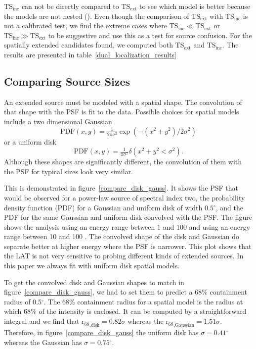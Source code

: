 \documentclass[12pt,preprint]{aastex}
\newcommand{\gev}{\text{GeV}\xspace}
\newcommand{\tsext}{{\ensuremath{\text{TS}_\text{ext}}}\xspace}
\newcommand{\tsinc}{\ensuremath{\text{TS}_\text{inc}}\xspace}
\newcommand{\rsixeight}{{\ensuremath{\text{r}_{68}}}\xspace}
\renewcommand{\deg}{\ensuremath{^\circ}\xspace}
\begin{document}
\tsinc can not be directly compared to \tsext to see which model is better
because the models are not nested (\cite{statistics_with_care}). Even
though the comparison of \tsext with \tsinc is not a calibrated test,
we find the extreme cases where $\tsinc \ll \tsext$ or $\tsinc\gg\tsext$
to be suggestive and use this as a test for source confusion. For the
spatially extended candidates found, we computed both \tsext and \tsinc.
The results are presented in table~\ref{dual_localization_results}

\subsection{Comparing Source Sizes}

\label{compare_source_size}

An extended source must be modeled with a spatial shape.
The convolution of that shape with the PSF is fit to the data.
Possible choices for spatial models include a two dimensional Gaussian
\begin{equation}
  \text{PDF}(x,y)=\tfrac{1}{2\pi\sigma^2}\exp\left(-(x^2+y^2)/2\sigma^2\right)
\end{equation}
or a uniform disk
\begin{equation}
  \text{PDF}(x,y)=\tfrac{1}{\pi\sigma^2}\delta\left(x^2+y^2<\sigma^2\right).
\end{equation}
Although these shapes are significantly different, the
convolution of them with the PSF for typical sizes look very
similar.

This is demonstrated in figure~\ref{compare_disk_gauss}.  It shows the
PSF that would be observed for a power-law source of spectral index two,
the probability density function (PDF) for a Gaussian and uniform disk of width
$0.5\deg$, and the PDF for the same Gaussian
and uniform disk convolved with the PSF.  The figure shows the analysis
using an energy range between 1 \gev and 100 \gev and using an energy
range between 10 \gev and 100 \gev.  The convolved shape of the disk and
Gaussian do separate better at higher energy where the PSF is narrower.
This plot shows that the LAT is not very sensitive to probing different
kinds of extended sources.  In this paper we always fit with uniform disk
spatial models.

To get the convolved disk and Gaussian shapes to match in
figure~\ref{compare_disk_gauss}, we had to set them to predict
a 68\% containment radius of 0.5\deg.  The 68\% containment
radius for a spatial model is the radius at which 68\% of the
intensity is enclosed.  It can be computed by a straightforward
integral and we find that $\rsixeight_\text{,disk}=0.82\sigma$
whereas the $\rsixeight_\text{,Gaussian}=1.51\sigma$. Therefore, in
figure~\ref{compare_disk_gauss} the uniform disk has
$\sigma=0.41\deg$ whereas the Gaussian has 
$\sigma=0.75\deg$. 
\end{document}
